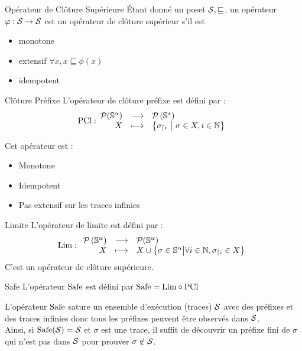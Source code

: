\documentclass{cours}
\begin{document}
\begin{définition}{Opérateur de Clôture Supérieure}{}
    Étant donné un poset $\mathcal{S}, \sqsubseteq$, un opérateur $\varphi : \mathcal{S} \to \mathcal{S}$ est un opérateur de clôture supérieur s'il est 
    \begin{itemize}
        \item monotone
        \item extensif $\forall x, x \sqsubseteq \phi(x)$
        \item idempotent
    \end{itemize}
\end{définition}
\begin{définition}{Clôture Préfixe}{}
    L'opérateur de clôture préfixe est défini par : 
    \[
        {\rm PCl :} \begin{array}{rcl}
            \mP(\S^{\alpha}) & \longrightarrow & \mP\left(\S^{*}\right)\\
            X & \longmapsto & \left\{\sigma_{\lceil i}\ \middle|\ \sigma \in X, i\in \N\right\}
        \end{array}
    \]
\end{définition}
Cet opérateur est : 
\begin{itemize}
    \item Monotone
    \item Idempotent
    \item Pas extensif sur les traces infinies
\end{itemize}

\begin{définition}{Limite}{}
    L'opérateur de limite est défini par : 
    \[ {\rm Lim} : 
        \begin{array}{rcl}
            \mathcal{P}\left(\mathbb{S}^{\alpha}\right) & \longrightarrow & \mathcal{P}(\mathbb{S}^{\alpha})\\
            X & \longmapsto & X \cup \left\{\sigma \in \mathbb{S}^{\alpha}\middle| \forall i \in \mathbb{N}, \sigma_{\lceil i} \in X\right\}
        \end{array}
    \]
    C'est un opérateur de clôture supérieure.
\end{définition}

\begin{définition}{Safe}{}
    L'opérateur $\rm Safe$ est défini par $\rm Safe = Lim \circ PCl$
\end{définition}
L'opérateur $\rm Safe$ sature un ensemble d'exécution (traces) $\mathcal{S}$ avec des préfixes et des traces infinies donc tous les préfixes peuvent être observés dans $\mathcal{S}$. \\
Ainsi, si ${\rm Safe}(\mathcal{S}) = \mathcal{S}$ et $\sigma$ est une trace, il suffit de découvrir un préfixe fini de $\sigma$ qui n'est pas dans $\mathcal{S}$ pour prouver $\sigma \notin \mathcal{S}$. 
\end{document}
